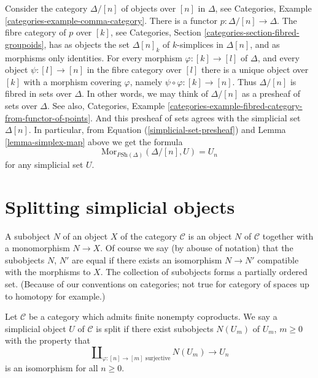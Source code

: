 \begin{example}
\label{example-simplex-category}
Consider the category $\Delta/[n]$ of objects over $[n]$
in $\Delta$, see
Categories, Example \ref{categories-example-comma-category}.
There is a functor $p : \Delta/[n] \to \Delta$.
The fibre category of $p$ over $[k]$, see
Categories, Section \ref{categories-section-fibred-groupoids},
has as objects the
set $\Delta[n]_k$ of $k$-simplices in $\Delta[n]$, and as
morphisms only identities. For every morphism
$\varphi : [k] \to [l]$ of $\Delta$, and every object $\psi : [l] \to [n]$
in the fibre category over $[l]$ there is a unique
object over $[k]$ with a morphism covering $\varphi$, namely
$\psi \circ \varphi : [k] \to [n]$. Thus $\Delta/[n]$
is fibred in sets over $\Delta$. In other words, we may
think of $\Delta/[n]$ as a presheaf of sets over $\Delta$.
See also, Categories,
Example \ref{categories-example-fibred-category-from-functor-of-points}.
And this presheaf of sets agrees with the simplicial set
$\Delta[n]$. In particular, from Equation
(\ref{simplicial-set-presheaf}) and 
Lemma \ref{lemma-simplex-map} above
we get the formula
$$
\text{Mor}_{\textit{PSh}(\Delta)}(\Delta/[n], U) = U_n
$$
for any simplicial set $U$.
\end{example}


\section{Splitting simplicial objects}
\label{section-splitting}

\noindent
A subobject $N$ of an object $X$ of the category $\mathcal{C}$
is an object $N$ of $\mathcal{C}$ together with a monomorphism
$N \to X$. Of course we say (by abouse of notation) that
the subobjects $N$, $N'$ are equal if there exists an isomorphism
$N \to N'$ compatible with the morphisms to $X$. The collection
of subobjects forms a partially ordered set. (Because of our
conventions on categories; not true for category of spaces
up to homotopy for example.)

\begin{definition}
\label{definition-split}
Let $\mathcal{C}$ be a category which admits finite nonempty coproducts.
We say a simplicial object $U$ of $\mathcal{C}$ is split
if there exist subobjects $N(U_m)$ of $U_m$, $m \geq 0$
with the property that
\begin{equation}
\label{equation-splitting}
\coprod\nolimits_{\varphi : [n] \to [m]\text{ surjective}}
N(U_m)
\longrightarrow
U_n
\end{equation}
is an isomorphism for all $n \geq 0$.
\end{definition}

